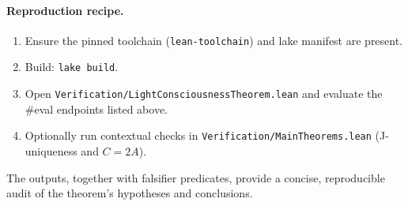 \documentclass[12pt,a4paper]{article}
\begin{document}
\paragraph{Reproduction recipe.}
\begin{enumerate}
  \item Ensure the pinned toolchain (\texttt{lean-toolchain}) and lake manifest are present.
  \item Build: \texttt{lake build}.
  \item Open \texttt{Verification/LightConsciousnessTheorem.lean} and evaluate the \#eval endpoints listed above.
  \item Optionally run contextual checks in \texttt{Verification/MainTheorems.lean} (J-uniqueness and \(C{=}2A\)).
\end{enumerate}
The outputs, together with falsifier predicates, provide a concise, reproducible audit of the theorem’s hypotheses and conclusions.
\end{document}
